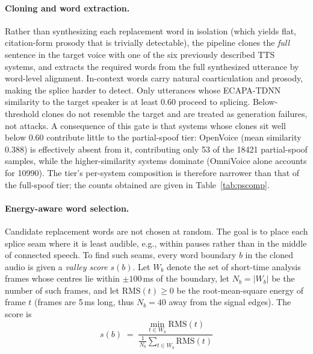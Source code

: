 \documentclass[11pt]{article}
\begin{document}
\paragraph{Cloning and word extraction.} Rather than synthesizing each
replacement word in isolation (which yields flat, citation-form prosody
that is trivially detectable), the pipeline clones the \emph{full}
sentence in the target voice with one of the six previously described
TTS systems, and extracts the required words from the full synthesized
utterance by word-level alignment.
In-context words carry natural coarticulation and prosody, making the
splice harder to detect. Only utterances whose ECAPA-TDNN similarity to the
target speaker is at least 0.60 proceed to splicing. Below-threshold
clones do not resemble the target and are treated as generation
failures, not attacks. A consequence of this gate is that systems whose
clones sit well below 0.60 contribute little to the partial-spoof tier:
OpenVoice (mean similarity 0.388) is effectively absent from it,
contributing only 53 of the 18421 partial-spoof samples, while the
higher-similarity systems dominate (OmniVoice alone accounts for
10990). The tier's per-system composition is therefore narrower than
that of the full-spoof tier; the counts obtained are given in
Table~\ref{tab:pscomp}.

\paragraph{Energy-aware word selection.} Candidate replacement words are
not chosen at random. The goal is to place each splice seam where it is
least audible, e.g., within pauses rather than in the middle of connected speech.
To find such seams, every word boundary $b$ in the cloned audio is given
a \emph{valley score} $s(b)$. Let $W_b$ denote the set of short-time
analysis frames whose centres lie within $\pm 100$\,ms of the boundary,
let $N_b = |W_b|$ be the number of such frames, and let
$\mathrm{RMS}(t) \ge 0$ be the root-mean-square energy of frame $t$
(frames are 5\,ms long, thus $N_b = 40$ away from the signal edges). The
score is
\begin{equation}
s(b) \;=\; \frac{\displaystyle\min_{t \in W_b} \mathrm{RMS}(t)}
                 {\displaystyle\frac{1}{N_b}\sum_{t \in W_b} \mathrm{RMS}(t)}
\label{eq:valleyscore}
\end{equation}
\end{document}
